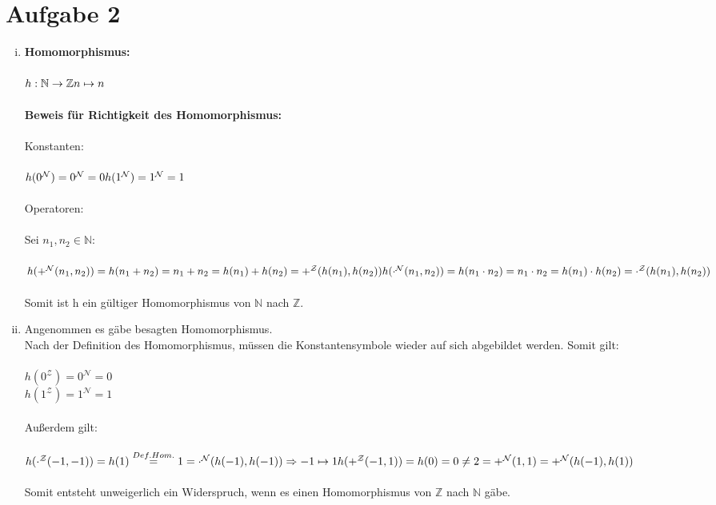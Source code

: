 \documentclass[a4paper,10pt]{article}
\newcommand{\N}{\mathbb{N}}
\newcommand{\Z}{\mathbb{Z}}
\begin{document}
\section*{Aufgabe 2}
\begin{enumerate}[(i)]
\item
\textbf{Homomorphismus:} \\
\\
\( h: \N \rightarrow \Z \\
n \mapsto n \) \\
\\
\textbf{Beweis für Richtigkeit des Homomorphismus:} \\
\\
Konstanten:\\
\\
\( h(0^{\mathcal{N}}) = 0^{\mathcal{N}} = 0 \\
h(1^{\mathcal{N}}) = 1^{\mathcal{N}} = 1 \) \\
\\
Operatoren: \\
\\
Sei $n_1,n_2 \in \N$:\\
\\
\( h(+^{\mathcal{N}} (n_1,n_2)) = h(n_1 + n_2) = n_1 + n_2 
= h(n_1) + h(n_2) = +^{\mathcal{Z}} (h(n_1),h(n_2)) \\
\\
 h(\cdot^{\mathcal{N}} (n_1,n_2)) = h(n_1 \cdot n_2) = n_1 \cdot n_2 
= h(n_1) \cdot h(n_2) = \cdot^{\mathcal{Z}} (h(n_1),h(n_2)) \) \\
\\
Somit ist h ein gültiger Homomorphismus von $\N$ nach $\Z$.

\item
Angenommen es gäbe besagten Homomorphismus. \\
Nach der Definition des Homomorphismus, müssen die Konstantensymbole wieder auf sich abgebildet werden.
Somit gilt: \\
\\
$h(0^{\mathcal{Z}}) = 0^{\mathcal{N}} = 0 $ \\
$h(1^{\mathcal{Z}}) = 1^{\mathcal{N}} = 1 $ \\
\\
Außerdem gilt: \\
\\
\( h(\cdot^{\mathcal{Z}}(-1,-1)) = h(1) \overset{Def. Hom.}{=} 1 = \cdot^{\mathcal{N}}(h(-1),h(-1))\\
\Rightarrow -1 \mapsto 1\\
\\
h(+^{\mathcal{Z}}(-1,1)) = h(0) = 0 \neq 2 = +^{\mathcal{N}}(1,1) = +^{\mathcal{N}}(h(-1),h(1)) \) \\
\\
Somit entsteht unweigerlich ein Widerspruch, wenn es einen Homomorphismus von $\mathbb{Z}$ nach $\mathbb{N}$ gäbe.

\end{enumerate}
\end{document}
